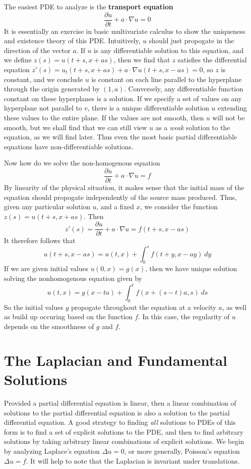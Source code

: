 The easiest PDE to analyze is the {\bf transport equation}
%
\[ \frac{\partial u}{\partial t} + a \cdot \nabla u = 0 \]
%
It is essentially an exercise in basic multivariate calculus to show the uniqueness and existence theory of this PDE. Intuitively, $u$ should just propogate in the direction of the vector $a$. If $u$ is any differentiable solution to this equation, and we define $z(s) = u(t+s, x + as)$, then we find that $z$ satisfies the differential equation $z'(s) = u_t(t+s,x + as) + a \cdot \nabla u(t+s, x - as) = 0$, so $z$ is constant, and we conclude $u$ is constant on each line parallel to the hyperplane through the origin generated by $(1,a)$. Conversely, any differentiable function constant on these hyperplanes is a solution. If we specify a set of values on any hyperplane not parallel to $v$, there is a unique differentiable solution $u$ extending these values to the entire plane. If the values are not smooth, then $u$ will not be smooth, but we shall find that we can still view $u$ as a {\it weak} solution to the equation, as we will find later. Thus even the most basic partial differentiable equations have non-differentiable solutions.

Now how do we solve the non-homogenous equation
%
\[ \frac{\partial u}{\partial t} + a \cdot \nabla u = f \]
%
By linearity of the physical situation, it makes sense that the initial mass of the equation should propogate independently of the source mass produced. Thus, given any particular solution $u$, and a fixed $x$, we consider the function $z(s) = u(t+s, x + as)$. Then
%
\[ z'(s) = \frac{\partial u}{\partial t} + a \cdot \nabla u = f(t + s, x - as) \]
%
It therefore follows that
%
\[ u(t + s, x - as) = u(t,x) + \int_0^s f(t+y,x-ay)\ dy \]
%
If we are given initial values $u(0,x) = g(x)$, then we have unique solution solving the nonhomogenous equation given by
%
\[ u(t,x) = g(x-ta) + \int_0^t f(x + (s-t)a,s)\ ds \]
%
So the initial values $g$ propogate throughout the equation at a velocity $a$, as well as build up occuring based on the function $f$. In this case, the regularity of $u$ depends on the smoothness of $g$ and $f$.

\section{The Laplacian and Fundamental Solutions}

Provided a partial differential equation is linear, then a linear combination of solutions to the partial differential equation is also a solution to the partial differential equation. A good strategy to finding {\it all} solutions to PDEs of this form is to find a set of explicit solutions to the PDE, and then to find arbitrary solutions by taking arbitrary linear combinations of explicit solutions. We begin by analyzing Laplace's equation $\Delta u = 0$, or more generally, Poisson's equation $\Delta u = f$. It will help to note that the Laplacian is invariant under translations.

